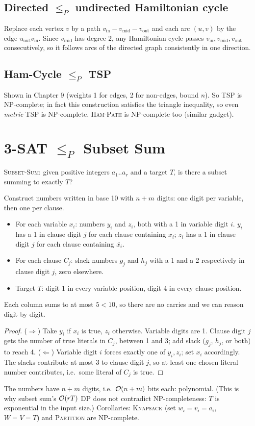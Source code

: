 \subsection{Directed \texorpdfstring{$\le_P$}{<=} undirected Hamiltonian cycle}
Replace each vertex $v$ by a path $v_{\text{in}}-v_{\text{mid}}-v_{\text{out}}$ and each arc $(u,v)$ by the edge $u_{\text{out}}v_{\text{in}}$. Since $v_{\text{mid}}$ has degree 2,
any Hamiltonian cycle passes $v_{\text{in}},v_{\text{mid}},v_{\text{out}}$ consecutively, so it follows arcs of the directed graph consistently in one direction.

\subsection{Ham-Cycle \texorpdfstring{$\le_P$}{<=} TSP}
Shown in Chapter 9 (weights 1 for edges, 2 for non-edges, bound $n$). So \textsc{TSP} is NP-complete; in fact this construction satisfies the triangle inequality, so even \emph{metric} TSP is NP-complete.
\textsc{Ham-Path} is NP-complete too (similar gadget).

\section{3-SAT \texorpdfstring{$\le_P$}{<=} Subset Sum}
\textsc{Subset-Sum}: given positive integers $a_1..a_r$ and a target $T$, is there a subset summing to exactly $T$?

Construct numbers written in base 10 with $n+m$ digits: one digit per variable, then one per clause.
\begin{itemize}
  \item For each variable $x_i$: numbers $y_i$ and $z_i$, both with a 1 in variable digit $i$. $y_i$ has a 1 in clause digit $j$ for each clause containing $x_i$;
        $z_i$ has a 1 in clause digit $j$ for each clause containing $\overline{x_i}$.
  \item For each clause $C_j$: slack numbers $g_j$ and $h_j$ with a 1 and a 2 respectively in clause digit $j$, zero elsewhere.
  \item Target $T$: digit 1 in every variable position, digit 4 in every clause position.
\end{itemize}
Each column sums to at most $5<10$, so there are no carries and we can reason digit by digit.
\begin{proof}
($\Rightarrow$) Take $y_i$ if $x_i$ is true, $z_i$ otherwise. Variable digits are 1. Clause digit $j$ gets the number of true literals in $C_j$, between 1 and 3;
add slack ($g_j$, $h_j$, or both) to reach 4.
($\Leftarrow$) Variable digit $i$ forces exactly one of $y_i,z_i$; set $x_i$ accordingly. The slacks contribute at most 3 to clause digit $j$, so at least one chosen
literal number contributes, i.e.\ some literal of $C_j$ is true.
\end{proof}
The numbers have $n+m$ digits, i.e.\ $\mathcal{O}(n+m)$ bits each: polynomial. (This is why subset sum's $\mathcal{O}(rT)$ DP does not contradict NP-completeness: $T$ is
exponential in the input size.) Corollaries: \textsc{Knapsack} (set $w_i=v_i=a_i$, $W=V=T$) and \textsc{Partition} are NP-complete.

